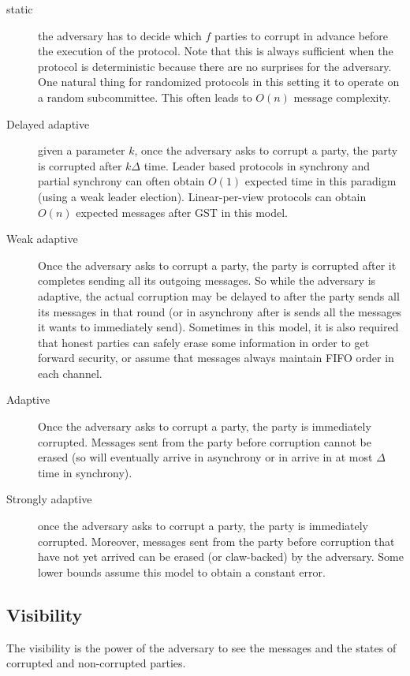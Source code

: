 \begin{description}
    \item[static] the adversary has to decide which $f$ parties to corrupt in advance
     before the execution of the protocol. 
     Note that this is always sufficient when the protocol is deterministic because 
     there are no surprises for the adversary. One natural thing for randomized 
     protocols in this setting it to operate on a random subcommittee. This often leads to $O(n)$ message complexity.

    \item[Delayed adaptive] given a parameter $k$, once the adversary asks to corrupt a party,
     the party is corrupted after $k\Delta$ time. 
     Leader based protocols in synchrony and partial synchrony can often obtain $O(1)$ expected time in
     this paradigm (using a weak leader election). 
     Linear-per-view protocols can obtain $O(n)$ expected messages after GST in this model.

    \item[Weak adaptive] 
    Once the adversary asks to corrupt a party, the party is corrupted after 
    it completes sending all its outgoing messages. 
    So while the adversary is adaptive, the actual corruption may be delayed to after the party sends all its messages in 
    that round (or in asynchrony after is sends all the messages it wants to immediately send).
    Sometimes in this model, it is also required that honest parties can safely erase some information 
    in order to get forward security, or assume that messages always maintain FIFO order in each channel.

    \item[Adaptive] Once the adversary asks to corrupt a party,
     the party is immediately corrupted. 
     Messages sent from the party before corruption cannot be erased (so will eventually arrive in 
     asynchrony or in arrive in at most $\Delta$ time in synchrony).

     \item[Strongly adaptive] once the adversary asks to corrupt a party, 
     the party is immediately corrupted. 
     Moreover, messages sent from the party before corruption that have not yet arrived can be erased 
     (or claw-backed) by the adversary. 
     Some lower bounds assume this model to obtain a constant error. 
\end{description}

\subsection{Visibility}
The visibility is the power of the adversary to see the messages and the states of corrupted and non-corrupted parties.

